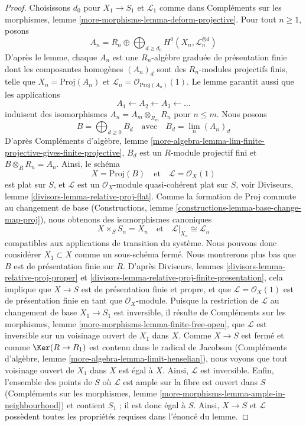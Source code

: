 \begin{proof}
Choisissons $d_0$ pour $X_1 \to S_1$ et $\mathcal{L}_1$ comme dans
Compléments sur les morphismes, lemme
\ref{more-morphisms-lemma-deform-projective}.
Pour tout $n \geq 1$, posons
$$
A_n = R_n \oplus
\bigoplus\nolimits_{d \geq d_0} H^0(X_n, \mathcal{L}_n^{\otimes d})
$$
D'après le lemme, chaque $A_n$ est une $R_n$-algèbre graduée de présentation
finie dont les composantes homogènes $(A_n)_d$ sont des $R_n$-modules
projectifs finis, telle que $X_n = \text{Proj}(A_n)$ et
$\mathcal{L}_n = \mathcal{O}_{\text{Proj}(A_n)}(1)$.
Le lemme garantit aussi que les applications
$$
A_1 \leftarrow A_2 \leftarrow A_3 \leftarrow \ldots
$$
induisent des isomorphismes $A_n = A_m \otimes_{R_m} R_n$ pour $n \leq m$.
Nous posons
$$
B = \bigoplus\nolimits_{d \geq 0} B_d
\quad\text{avec}\quad
B_d = \lim_n (A_n)_d
$$
D'après Compléments d'algèbre, lemme
\ref{more-algebra-lemma-lim-finite-projective-gives-finite-projective},
$B_d$ est un $R$-module projectif fini et $B \otimes_R R_n = A_n$.
Ainsi, le schéma
$$
X = \text{Proj}(B)
\quad\text{et}\quad
\mathcal{L} = \mathcal{O}_X(1)
$$
est plat sur $S$, et $\mathcal{L}$ est un $\mathcal{O}_X$-module
quasi-cohérent plat sur $S$, voir
Diviseurs, lemme \ref{divisors-lemma-relative-proj-flat}.
Comme la formation de Proj commute au changement de base
(Constructions, lemme \ref{constructions-lemma-base-change-map-proj}),
nous obtenons des isomorphismes canoniques
$$
X \times_S S_n = X_n
\quad\text{et}\quad
\mathcal{L}|_{X_n} \cong \mathcal{L}_n
$$
compatibles aux applications de transition du système.
Nous pouvons donc considérer $X_1 \subset X$ comme un sous-schéma fermé.
Nous montrerons plus bas que $B$ est de présentation finie sur $R$.
D'après Diviseurs, lemmes \ref{divisors-lemma-relative-proj-proper} et
\ref{divisors-lemma-relative-proj-finite-presentation},
cela implique que $X \to S$ est de présentation finie et propre, et que
$\mathcal{L} = \mathcal{O}_X(1)$ est de présentation finie en tant que
$\mathcal{O}_X$-module.
Puisque la restriction de $\mathcal{L}$ au changement de base
$X_1 \to S_1$ est inversible, il résulte de
Compléments sur les morphismes, lemme
\ref{more-morphisms-lemma-finite-free-open}, que $\mathcal{L}$ est inversible
sur un voisinage ouvert de $X_1$ dans $X$.
Comme $X \to S$ est fermé et comme $\Ker(R \to R_1)$ est contenu dans le
radical de Jacobson
(Compléments d'algèbre, lemme \ref{more-algebra-lemma-limit-henselian}),
nous voyons que tout voisinage ouvert de $X_1$ dans $X$ est égal à $X$.
Ainsi, $\mathcal{L}$ est inversible. Enfin, l'ensemble des points de $S$ où
$\mathcal{L}$ est ample sur la fibre est ouvert dans $S$
(Compléments sur les morphismes, lemme
\ref{more-morphisms-lemma-ample-in-neighbourhood})
et contient $S_1$ ; il est donc égal à $S$. Ainsi, $X \to S$ et
$\mathcal{L}$ possèdent toutes les propriétés requises dans l'énoncé du lemme.


\end{proof}
